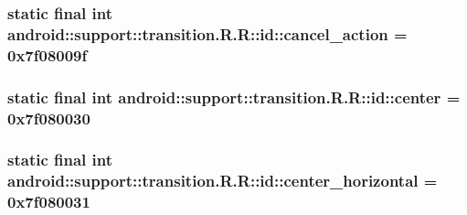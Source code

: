 \hypertarget{classandroid_1_1support_1_1transition_1_1_r_1_1id_c82063e361f896d49780374d1a7f464a}{
\subsubsection[{cancel\_\-action}]{\setlength{\rightskip}{0pt plus 5cm}static final int android::support::transition.R.R::id::cancel\_\-action = 0x7f08009f}}
\label{classandroid_1_1support_1_1transition_1_1_r_1_1id_c82063e361f896d49780374d1a7f464a}


\hypertarget{classandroid_1_1support_1_1transition_1_1_r_1_1id_317c360c22448c7f2244aee7befac36c}{
\subsubsection[{center}]{\setlength{\rightskip}{0pt plus 5cm}static final int android::support::transition.R.R::id::center = 0x7f080030}}
\label{classandroid_1_1support_1_1transition_1_1_r_1_1id_317c360c22448c7f2244aee7befac36c}


\hypertarget{classandroid_1_1support_1_1transition_1_1_r_1_1id_53756f4765a36f20b0aae924d7065a26}{
\subsubsection[{center\_\-horizontal}]{\setlength{\rightskip}{0pt plus 5cm}static final int android::support::transition.R.R::id::center\_\-horizontal = 0x7f080031}}
\label{classandroid_1_1support_1_1transition_1_1_r_1_1id_53756f4765a36f20b0aae924d7065a26}


